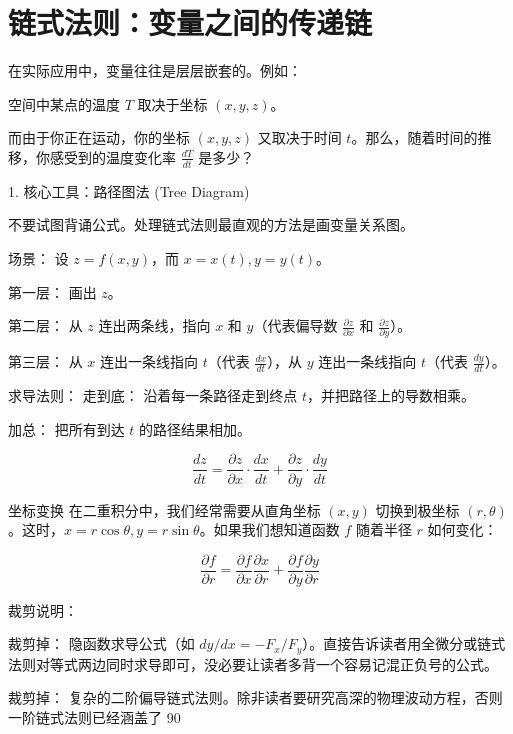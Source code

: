 \section{链式法则：变量之间的传递链}

在实际应用中，变量往往是层层嵌套的。例如：

空间中某点的温度 $T$ 取决于坐标 $(x, y, z)$。

而由于你正在运动，你的坐标 $(x, y, z)$ 又取决于时间 $t$。那么，随着时间的推移，你感受到的温度变化率 $\frac{dT}{dt}$ 是多少？

1. 核心工具：路径图法 (Tree Diagram)

不要试图背诵公式。处理链式法则最直观的方法是画变量关系图。

场景： 设 $z = f(x, y)$，而 $x = x(t), y = y(t)$。

第一层： 画出 $z$。

第二层： 从 $z$ 连出两条线，指向 $x$ 和 $y$（代表偏导数 $\frac{\partial z}{\partial x}$ 和 $\frac{\partial z}{\partial y}$）。

第三层： 从 $x$ 连出一条线指向 $t$（代表 $\frac{dx}{dt}$），从 $y$ 连出一条线指向 $t$（代表 $\frac{dy}{dt}$）。

求导法则： 走到底： 沿着每一条路径走到终点 $t$，并把路径上的导数相乘。

加总： 把所有到达 $t$ 的路径结果相加。

$$\frac{dz}{dt} = \frac{\partial z}{\partial x} \cdot \frac{dx}{dt} + \frac{\partial z}{\partial y} \cdot \frac{dy}{dt}$$

坐标变换
在二重积分中，我们经常需要从直角坐标 $(x, y)$ 切换到极坐标 $(r, \theta)$。这时，$x = r\cos\theta, y = r\sin\theta$。如果我们想知道函数 $f$ 随着半径 $r$ 如何变化：

$$\frac{\partial f}{\partial r} = \frac{\partial f}{\partial x}\frac{\partial x}{\partial r} + \frac{\partial f}{\partial y}\frac{\partial y}{\partial r}$$

裁剪说明：

裁剪掉： 隐函数求导公式（如 $dy/dx = -F_x/F_y$）。直接告诉读者用全微分或链式法则对等式两边同时求导即可，没必要让读者多背一个容易记混正负号的公式。

裁剪掉： 复杂的二阶偏导链式法则。除非读者要研究高深的物理波动方程，否则一阶链式法则已经涵盖了 90%

